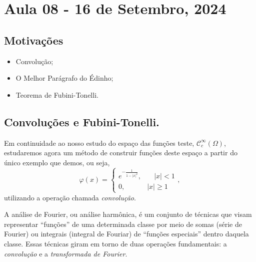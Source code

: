 \documentclass[../distribution_theory_notes.tex]{subfiles}
\begin{document}
\section{Aula 08 - 16 de Setembro, 2024}
\subsection{Motivações}
\begin{itemize}
	\item Convolução;
	\item O Melhor Parágrafo do Édinho;
	\item Teorema de Fubini-Tonelli.
\end{itemize}
\subsection{Convoluções e Fubini-Tonelli.}
Em continuidade ao nosso estudo do espaço das funções teste, \(\mathcal{C}_{c}^{\infty}(\Omega )\), estudaremos agora um método de construir funções deste espaço a partir do único exemplo que demos, ou seja,
\[
	\varphi (x) = \left\{\begin{array}{ll}
		e^{-\frac{1}{1-|x|^{2}}}, & \quad |x|<1 \\
		0,                        & |x|\geq 1
	\end{array}\right.,
\]
utilizando a operação chamada \textit{convolução}.
\begin{tcolorbox}[
		skin=enhanced,
		title=Observação,
		fonttitle=\bfseries,
		colframe=black,
		colbacktitle=cyan!75!white,
		colback=cyan!15,
		colbacklower=black,
		coltitle=black,
		drop fuzzy shadow,
	]
	A análise de Fourier, ou análise harmônica, é um conjunto de técnicas que visam representar ``funções'' de uma determinada classe por meio de somas (série de Fourier) ou integrais (integral de Fouriar) de ``funções especiais'' dentro daquela classe. Essas técnicas giram em torno de duas operações fundamentais: a \textit{convolução} e a \textit{transformada de Fourier}.
\end{tcolorbox}
\end{document}
